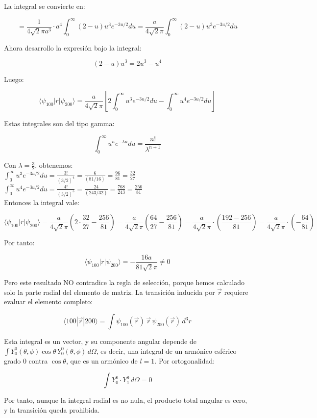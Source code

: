 \documentclass{article}
\theoremstyle{nonumberplain}
\begin{document}
La integral se convierte en:

$$
= \frac{1}{4\sqrt{2} \pi a^3} \cdot a^4 \int_0^\infty (2 - u) u^3 e^{-3u/2} du = \frac{a}{4\sqrt{2} \pi} \int_0^\infty (2 - u) u^3 e^{-3u/2} du
$$

Ahora desarrollo la expresión bajo la integral:

$$
(2 - u) u^3 = 2u^3 - u^4
$$

Luego:

$$
\langle \psi_{100} | r | \psi_{200} \rangle = \frac{a}{4\sqrt{2} \pi} \left[ 2 \int_0^\infty u^3 e^{-3u/2} du - \int_0^\infty u^4 e^{-3u/2} du \right]
$$

Estas integrales son del tipo gamma:

$$
\int_0^\infty u^n e^{-\lambda u} du = \frac{n!}{\lambda^{n+1}}
$$

Con $\lambda = \frac{3}{2}$, obtenemos: \\

$\int_0^\infty u^3 e^{-3u/2} du = \frac{3!}{(3/2)^4} = \frac{6}{(81/16)} = \frac{96}{81} = \frac{32}{27}$ \\
$\int_0^\infty u^4 e^{-3u/2} du = \frac{4!}{(3/2)^5} = \frac{24}{(243/32)} = \frac{768}{243} = \frac{256}{81}$ \\

Entonces la integral vale:

$$
\langle \psi_{100} | r | \psi_{200} \rangle = \frac{a}{4\sqrt{2}\pi} \left( 2 \cdot \frac{32}{27} - \frac{256}{81} \right)
= \frac{a}{4\sqrt{2}\pi} \left( \frac{64}{27} - \frac{256}{81} \right)
= \frac{a}{4\sqrt{2}\pi} \cdot \left( \frac{192 - 256}{81} \right)
= \frac{a}{4\sqrt{2}\pi} \cdot \left( -\frac{64}{81} \right)
$$

Por tanto:

$$
\langle \psi_{100} | r | \psi_{200} \rangle = -\frac{16a}{81\sqrt{2}\pi} \neq 0
$$

Pero este resultado NO contradice la regla de selección, porque hemos calculado solo la parte radial del elemento de matriz. La transición inducida por $\vec{r}$ requiere evaluar el elemento completo:

$$
\langle 100 | \vec{r} | 200 \rangle = \int \psi_{100}(\vec{r})\, \vec{r} \, \psi_{200}(\vec{r})\, d^3r
$$

Esta integral es un vector, y su componente angular depende de $\int Y_0^{0}(\theta, \phi) \cos\theta\, Y_0^0(\theta, \phi)\, d\Omega$, es decir, una integral de un armónico esférico grado 0 contra $\cos\theta$, que es un armónico de $l = 1$. Por ortogonalidad:

$$
\int Y_0^0 \cdot Y_1^0\, d\Omega = 0
$$

Por tanto, aunque la integral radial es no nula, el producto total angular es cero, y la transición queda prohibida.
\end{document}
